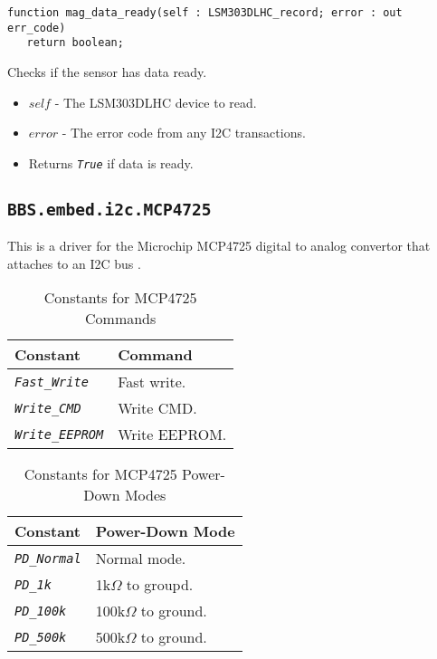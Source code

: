 \documentclass[10pt, openany]{book}
\newcommand{\package}[1]{\texttt{#1}}
\newcommand{\constant}[1]{\emph{\texttt{#1}}}
\begin{document}
\begin{lstlisting}
function mag_data_ready(self : LSM303DLHC_record; error : out err_code)
   return boolean;
\end{lstlisting}
Checks if the sensor has data ready.
\begin{itemize}
  \item $self$ - The LSM303DLHC device to read.
  \item $error$ - The error code from any I2C transactions.
  \item Returns \constant{True} if data is ready.
\end{itemize}

\subsection{\package{BBS.embed.i2c.MCP4725}}
This is a driver for the Microchip MCP4725 digital to analog convertor that attaches to an I2C bus \cite{MCP4725}.

\begin{table}[!h]
\begin{center}
  \begin{tabular}{l|l}
    Constant & Command \\
    \hline
    \constant{Fast\_Write} & Fast write. \\
    \constant{Write\_CMD} & Write CMD. \\
    \constant{Write\_EEPROM} & Write EEPROM. \\
  \end{tabular}
  \caption{Constants for MCP4725 Commands}
  \label{tbl:MCP4725cmd}
\end{center}
\end{table}

\begin{table}[!h]
\begin{center}
  \begin{tabular}{l|l}
    Constant & Power-Down Mode \\
    \hline
    \constant{PD\_Normal} & Normal mode. \\
    \constant{PD\_1k} & 1k$\Omega$ to groupd. \\
    \constant{PD\_100k} & 100k$\Omega$ to ground. \\
    \constant{PD\_500k} & 500k$\Omega$ to ground. \\
  \end{tabular}
  \caption{Constants for MCP4725 Power-Down Modes}
  \label{tbl:MCP4725pdm}
\end{center}
\end{table}
\end{document}
